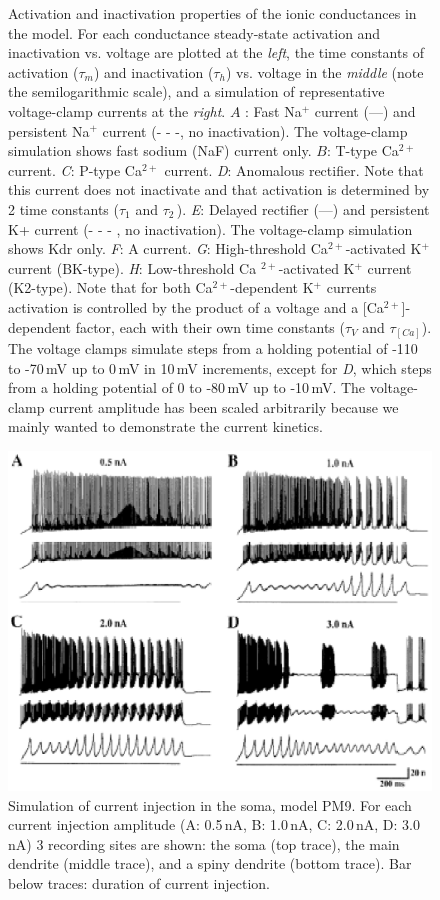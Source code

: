 \documentclass[12pt]{article}
\begin{document}
\begin{figure}[h]
   \caption{Activation and inactivation properties of the ionic conductances in the model. For each conductance steady-state activation and inactivation vs. voltage are plotted at the {\em left}, the time constants of activation ($\tau_m$) and inactivation ($\tau_h$) vs. voltage in the {\em middle} (note the semilogarithmic scale), and a simulation of representative voltage-clamp currents at the {\em right}. $A$ : Fast Na$^+$ current (---) and persistent Na$^+$ current (- - -, no inactivation). The voltage-clamp simulation shows fast sodium (NaF) current only. $B$: T-type Ca$^{2+}$ current. {\it C}: P-type Ca$^{2+}$ current. {\it D}: Anomalous rectifier. Note that this current does not inactivate and that activation is determined by 2 time constants ($\tau_1$ and $\tau_2$\,\cite{Spain-W-J:1987ij}). {\it E}: Delayed rectifier (---) and persistent K+ current (- - - , no inactivation). The voltage-clamp simulation shows Kdr only. {\it F}: A current. {\it G}: High-threshold Ca$^{2+}$-activated K$^+$ current (BK-type). {\it H}: Low-threshold Ca $^{2+}$-activated K$^+$ current (K2-type). Note that for both Ca$^{2+}$-dependent K$^+$ currents activation is controlled by the product of a voltage and a [Ca$^{2+}$]-dependent factor, each with their own time constants ($\tau_V$ and $\tau_{[Ca]}$). The voltage clamps simulate steps from a holding potential of -110 to -70\,mV up to 0\,mV in 10\,mV increments, except for {\it D}, which steps from a holding potential of 0 to -80\,mV up to -10\,mV. The voltage-clamp current amplitude has been scaled arbitrarily because we mainly wanted to demonstrate the current kinetics.}
   \label{fig:DS1.2}
\end{figure}

\clearpage

\begin{figure}[h]
\centering
   \includegraphics[scale=0.75]{figures/Fig.1.3.eps}
   \caption{Simulation of current injection in the
soma, model PM9. For each current injection amplitude
(A: 0.5\,nA, B: 1.0\,nA, C: 2.0\,nA, D: 3.0\,
nA) 3 recording sites are shown: the soma (top
trace), the main dendrite (middle trace), and a
spiny dendrite (bottom trace). Bar below traces: duration
of current injection.}
   \label{fig:DS1.3}
\end{figure}
\end{document}
